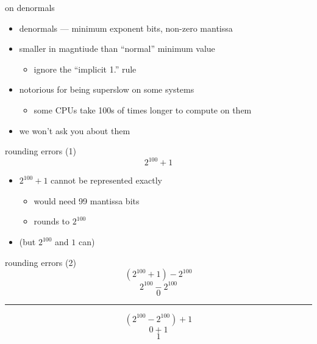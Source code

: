 \begin{frame}{on denormals}
\begin{itemize}
\item denormals --- minimum exponent bits, non-zero mantissa
\item smaller in magntiude than ``normal'' minimum value
    \begin{itemize}
    \item ignore the ``implicit 1.'' rule
    \end{itemize}
\item notorious for being superslow on some systems
    \begin{itemize}
    \item some CPUs take 100s of times longer to compute on them
    \end{itemize}
\item we won't ask you about them
\end{itemize}
\end{frame}

\begin{frame}{rounding errors (1)}
\[
2^{100} + 1
\]
\begin{itemize}
\item $2^{100}+1$ cannot be represented exactly
    \begin{itemize}
    \item would need 99 mantissa bits
    \item rounds to $2^{100}$
    \end{itemize}
\item (but $2^{100}$ and $1$ can)
\end{itemize}
\end{frame}

\begin{frame}{rounding errors (2)}
\[
(2^{100} + 1) - 2^{100} 
\]
\[
2^{100} - 2^{100}
\]
\[
0
\]
\vspace{.25cm}
\hrule
\vspace{.25cm}
\[
(2^{100} - 2^{100}) + 1
\]
\[
0 + 1
\]
\[
1
\]
\end{frame}
